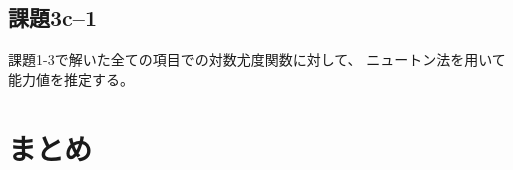 \documentclass[12pt]{jarticle}
\begin{document}
\subsection{課題3c–1}
\begin{shadebox}
    課題1-3で解いた全ての項目での対数尤度関数に対して、
    ニュートン法を用いて能力値を推定する。
\end{shadebox}


\section{まとめ}



\clearpage
\appendix
\end{document}
